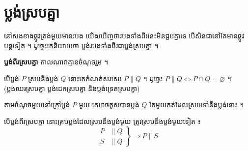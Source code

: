 \section{ប្លង់ស្របគ្នា}
នៅសងខាងផ្លូវត្រង់មួយមានរបង យើងឃើញថារបងទាំងពីរនេះមិនជួបគ្នាទេ បើសិនជានៅតែមានផ្លូវបន្តទៀត ។ ដូច្នេះគេនិយាយថា ប្លង់របងទាំងពីរជាប្លង់ស្របគ្នា ។
\begin{definition}[និយមន័យ]
\textbf{ប្លង់ពីរស្របគ្នា} កាលណាវាគ្មានចំណុចរួម ។
\end{definition}
បើប្លង់ $P$ ស្របនឹងប្លង់ $Q$ នោះគេកំណត់សរសេរ $P \parallel Q$ ។ ដូច្នេះ $P \parallel Q \Leftrightarrow P \cap Q = \varnothing$ ។ (ប្លង់ឈរស្របគ្នា ប្លង់ដេកស្របគ្នា និងប្លង់ទ្រេតស្របគ្នា)
\begin{center}
\end{center}

\begin{theorem}[លក្ខណៈទី ១]
តាមចំណុចមួយនៅក្រៅប្លង់ $P$ មួយ គេអាចគូសបានប្លង់ $Q$ តែមួយគត់ដែលស្របទៅនឹងប្លង់នោះ ។
\end{theorem}
\begin{theorem}[លក្ខណៈទី ២]
បើប្លង់ពីរស្របគ្នា នោះគ្រប់ប្លង់ដែលស្របនឹងប្លង់មួយ ត្រូវស្របនឹងប្លង់មួយទៀត ៖
\[
\left.\begin{aligned} P &\parallel Q\\ S &\parallel Q \end{aligned}\right\} \Rightarrow P \parallel S
\]
\end{theorem}

